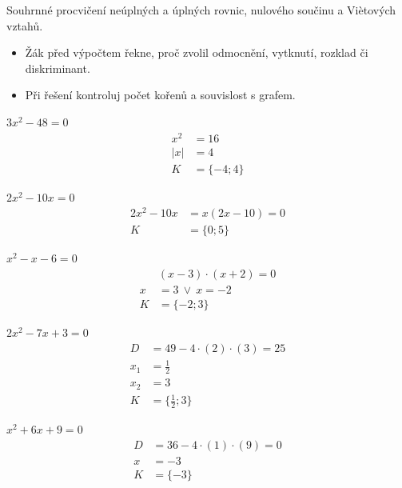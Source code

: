 \documentclass[11pt,a4paper]{article}
\begin{document}
Souhrnné procvičení neúplných a úplných rovnic, nulového součinu a Viètových vztahů.
\begin{itemize}
\item Žák před výpočtem řekne, proč zvolil odmocnění, vytknutí, rozklad či diskriminant.
\item Při řešení kontroluj počet kořenů a souvislost s grafem.
\end{itemize}
\begin{prikladReseniBox}[title={Příklad 1}]
$3x^{2} - 48=0$
\tcblower
\[
\begin{aligned}
x^2&=16\\|x|&=4\\[2pt]
K&=\{-4;4\}
\end{aligned}
\]
\end{prikladReseniBox}
\begin{prikladReseniBox}[title={Příklad 2}]
$2x^{2} - 10x=0$
\tcblower
\[
\begin{aligned}
2x^{2} - 10x&=x(2x - 10)=0\\[2pt]
K&=\{0;5\}
\end{aligned}
\]
\end{prikladReseniBox}
\begin{prikladReseniBox}[title={Příklad 3}]
$x^{2} - x - 6=0$
\tcblower
\[
\begin{aligned}
&\left(x - 3\right) \cdot \left(x + 2\right)=0\\[2pt]
x&=3\ \vee\ x=-2\\[2pt]
K&=\{-2;3\}
\end{aligned}
\]
\end{prikladReseniBox}
\begin{zadaniReseniBox}[title={Samostatná práce 1}]
$2x^{2} - 7x + 3=0$
\tcblower
\[
\begin{aligned}
D&=49-4\cdot(2)\cdot(3)=25\\[2pt]
x_1&=\frac{1}{2}\\[2pt]
x_2&=3\\[2pt]
K&=\{\frac{1}{2};3\}
\end{aligned}
\]
\end{zadaniReseniBox}
\begin{zadaniReseniBox}[title={Samostatná práce 2}]
$x^{2} + 6x + 9=0$
\tcblower
\[
\begin{aligned}
D&=36-4\cdot(1)\cdot(9)=0\\[2pt]
x&=-3\\[2pt]
K&=\{-3\}
\end{aligned}
\]
\end{zadaniReseniBox}
\end{document}
